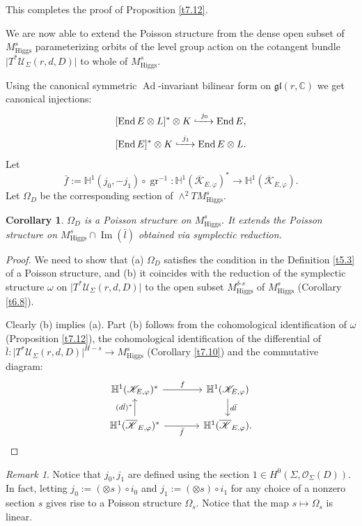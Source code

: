 \documentclass[12pt,a4paper,oneside,english]{smfart}
\newtheorem{cor}[thm]{Corollary}
\theoremstyle{definition}
\theoremstyle{remark}
\newtheorem{rem}[thm]{Remark}
\DeclareMathOperator{\End}{End}
\DeclareMathOperator{\Ad}{Ad}
\DeclareMathOperator{\gr}{gr}
\DeclareMathOperator{\image}{Im}
\newcommand{\Hig}{\mathrm{Higgs}}
\newcommand{\MHs}{M^{s}_{\Hig}}
\newcommand{\MHds}{M^{\delta\text{-}s}_{\Hig}}
\newcommand{\cU}{\mathcal{U}}
\newcommand{\cO}{\mathcal{O}}
\newcommand{\KK}{\mathscr{K}}
\newcommand{\HH}{\mathbb{H}}
\newcommand{\lbar}{\bar{l}}
\newcommand{\tot}[1]{\lvert #1 \rvert}
\begin{document}
This completes the proof of Proposition \ref{t7.12}.

We are now able to extend the Poisson structure from the dense open subset of $\MHs$ parameterizing orbits of the level group action on the cotangent bundle $\tot{T^*\cU_\Sigma(r, d, D)}$ to whole of $\MHs$.

Using the canonical symmetric $\Ad$-invariant bilinear form on $\mathfrak{gl}(r, \mathbb{C})$ we get canonical injections:
\[
[\End E \otimes L]^* \otimes K \xhookrightarrow{\ j_0\ } \End E,
\]
\[
[\End E]^* \otimes K \xhookrightarrow{\ j_1\ } \End E \otimes L.
\]
Let
\[
\bar{f} := \HH^1(j_0, -j_1) \circ \gr^{-1} \colon \HH^1(\overline{\KK}_{E, \varphi})^* \to \HH^1(\overline{\KK}_{E, \varphi}).
\]
Let $\Omega_D$ be the corresponding section of $\wedge^2 T\MHs$.

\begin{cor}\label{t7.15}
$\Omega_D$ is a Poisson structure on $\MHs$. It extends the Poisson structure on $\MHs \cap \image(\lbar)$ obtained via symplectic reduction.
\end{cor}

\begin{proof}
We need to show that (a) $\Omega_D$ satisfies the condition in the Definition \ref{t5.3} of a Poisson structure, and (b) it coincides with the reduction of the symplectic structure $\omega$ on $\tot{T^*\cU_\Sigma(r, d, D)}$ to the open subset $\MHds$ of $\MHs$ (Corollary \ref{t6.8}).

Clearly (b) implies (a). Part (b) follows from the cohomological identification of $\omega$ (Proposition \ref{t7.12}), the cohomological identification of the differential of $\lbar \colon \tot{T^*\cU_\Sigma(r, d, D)}^{H-s} \to \MHs$ (Corollary \ref{t7.10}) and the commutative diagram:
\[
\begin{tikzcd}[column sep=large]
\HH^1(\KK_{E, \varphi})^* \arrow[r, "f"] & \HH^1(\KK_{E, \varphi}) \arrow[d, "d\lbar"] \\
\HH^1(\overline{\KK}_{E, \varphi})^* \arrow[u, "(d\lbar)^*"] \arrow[r, "\bar{f}"'] & \HH^1(\overline{\KK}_{E, \varphi}).
\end{tikzcd} \qedhere
\]
\end{proof}

\begin{rem}\label{t7.16}
Notice that $j_0, j_1$ are defined using the section $1 \in H^0(\Sigma, \cO_\Sigma(D))$. In fact, letting $j_0 := (\otimes s) \circ i_0$ and $j_1 := (\otimes s) \circ i_1$ for any choice of a nonzero section $s$ gives rise to a Poisson structure $\Omega_s$. Notice that the map $s \mapsto \Omega_s$ is linear.
\end{rem}
\end{document}

